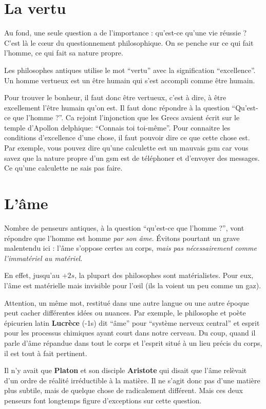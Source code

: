 \section{La vertu}
Au fond, une seule question a de l'importance : qu'est-ce qu'une vie réussie ?
C'est là le cœur du questionnement philosophique.
On se penche sur ce qui fait l'homme, ce qui fait sa nature propre.

Les philosophes antiques utilise le mot ``vertu'' avec la signification ``excellence''.
Un homme vertueux est un être humain qui s'est accompli comme être humain.

Pour trouver le bonheur, il faut donc être vertueux, c'est à dire, à être excellement l'être humain qu'on est.
Il faut donc répondre à la question ``Qu'est-ce que l'homme ?''.
Ca rejoint l'injonction que les Grecs avaient écrit sur le temple d'Apollon delphique:
``Connais toi toi-même''.
Pour connaitre les conditions d'excellence d'une chose, il faut pouvoir dire ce que cette chose est.
Par exemple, vous pouvez dire qu'une calculette est un mauvais gsm car vous savez que la nature propre
d'un gsm est de téléphoner et d'envoyer des messages.
Ce qu'une calculette ne sais pas faire.

\section{L'âme}
Nombre de penseurs antiques, à la question ``qu'est-ce que l'homme ?'', vont répondre
que l'homme est homme \textit{par son âme}.
Évitons pourtant un grave malentendu ici : l'âme
s'oppose certes au corps, \textit{mais pas nécessairement comme l'immatériel au matériel}.

En effet, jusqu'au $+2s$, la plupart des philosophes sont matérialistes.
Pour eux, l'âme est matérielle mais invisible pour l'œil (ils la voient un peu comme un gaz).

Attention, un même mot, restitué dans une autre langue ou une autre époque peut cacher différentes idées ou nuances.
Par exemple, le philosophe et poète épicurien latin \textbf{Lucrèce} (-1s) dit ``âme'' pour ``système nerveux central'' et esprit pour les processus chimiques ayant court dans notre cerveau.
Du coup, quand il parle d'âme répandue dans tout le corps et l'esprit situé à un lieu précis du corps, il est tout à fait pertinent.

Il n'y avait que \textbf{Platon} et son disciple \textbf{Aristote} qui disait que l'âme relèvait d'un ordre de réalité irréductible à la matière. Il ne s'agit donc pas d'une matière plus subtile, mais de quelque chose de
radicalement différent.
Mais ces deux penseurs font longtemps figure d'exceptions sur cette question.

